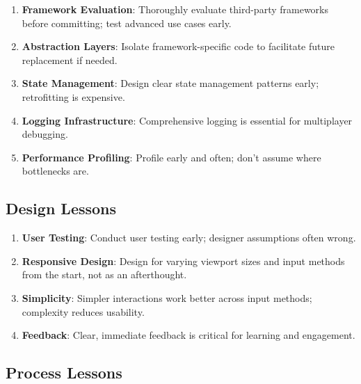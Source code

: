 \begin{enumerate}
    \item \textbf{Framework Evaluation}: Thoroughly evaluate third-party frameworks before committing; test advanced use cases early.

    \item \textbf{Abstraction Layers}: Isolate framework-specific code to facilitate future replacement if needed.

    \item \textbf{State Management}: Design clear state management patterns early; retrofitting is expensive.

    \item \textbf{Logging Infrastructure}: Comprehensive logging is essential for multiplayer debugging.

    \item \textbf{Performance Profiling}: Profile early and often; don't assume where bottlenecks are.
\end{enumerate}

\subsection{Design Lessons}
\label{subsec:design-lessons}

\begin{enumerate}
    \item \textbf{User Testing}: Conduct user testing early; designer assumptions often wrong.

    \item \textbf{Responsive Design}: Design for varying viewport sizes and input methods from the start, not as an afterthought.

    \item \textbf{Simplicity}: Simpler interactions work better across input methods; complexity reduces usability.

    \item \textbf{Feedback}: Clear, immediate feedback is critical for learning and engagement.
\end{enumerate}

\subsection{Process Lessons}
\label{subsec:process-lessons}

